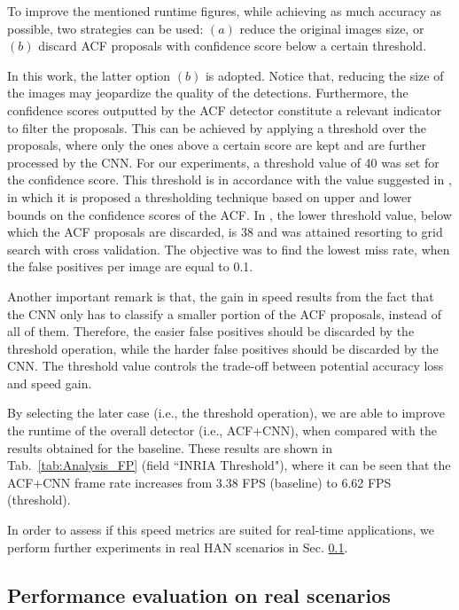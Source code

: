 \documentclass[5p,time]{elsarticle}
\begin{document}
To improve the mentioned runtime figures, while achieving as much accuracy as possible, two strategies can be used: $(a)$ reduce the original images size, or $(b)$ discard ACF proposals with confidence score below a certain threshold.

In this work, the latter option $(b)$ is adopted. Notice that, reducing the size of the images may jeopardize the quality of the detections. Furthermore, the confidence scores outputted by the ACF detector constitute a relevant indicator to filter the proposals. This can be achieved by applying a threshold over the proposals, where only the ones above a certain score are kept and are further processed by the CNN. For our experiments, a threshold value of 40 was set for the confidence score. This threshold is in accordance with the value suggested in \cite{VermaWICCV2015}, in which it is proposed a thresholding technique based on upper and lower bounds on the confidence scores of the ACF. In \cite{VermaWICCV2015}, the lower threshold value, below which the ACF proposals are discarded, is 38 and was attained resorting to grid search with cross validation. The objective was to find the lowest miss rate, when the false positives per image are equal to 0.1.
%

Another important remark is that, the gain in speed results from the fact that the CNN only has to classify a smaller portion of the ACF proposals, instead of all of them. Therefore, the easier false positives should be discarded by the threshold operation, while the harder false positives should be discarded by the CNN. The threshold value controls the trade-off between potential accuracy loss and speed gain.

By selecting the later case (i.e., the threshold operation), we are able to improve the runtime of the overall detector (i.e., ACF+CNN), when compared with the results obtained for the baseline. These results are shown in Tab.~\ref{tab:Analysis_FP} (field ``INRIA Threshold"), where it can be seen that the ACF+CNN frame rate increases from 3.38 FPS (baseline) to 6.62 FPS (threshold).

In order to assess if this speed metrics are suited for real-time applications, we perform further experiments in real HAN scenarios in Sec. \ref{sec:Results-CNN-Corridor-MBOT}.

\subsection{Performance evaluation on real scenarios}\label{sec:Results-CNN-Corridor-MBOT}
\end{document}
